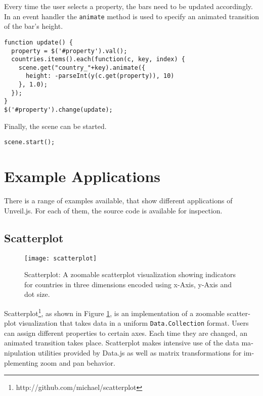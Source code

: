 \begin{english}
\SuperPar Every time the user selects a property, the bars need to be updated accordingly. In an event handler the \texttt{animate} method is used to specify an animated transition of the bar's height.

\begin{verbatim}
function update() {
  property = $('#property').val();
  countries.items().each(function(c, key, index) {
    scene.get("country_"+key).animate({
      height: -parseInt(y(c.get(property)), 10)
    }, 1.0);
  });
}
$('#property').change(update);
\end{verbatim}

\SuperPar Finally, the scene can be started.

\begin{verbatim}
scene.start();
\end{verbatim}


\section{Example Applications}


There is a range of examples available, that show different applications of Unveil.js. For each of them, the source code is available for inspection.

\subsection{Scatterplot}

\begin{figure}
\centering
\texttt{[image: scatterplot]}
\caption{Scatterplot: A zoomable scatterplot visualization showing indicators for countries in three dimensions encoded using x-Axis, y-Axis and dot size.}
\label{fig:scatterplot}
\end{figure}

Scatterplot\footnote{http://github.com/michael/scatterplot}, as shown in Figure \ref{fig:scatterplot}, is an implementation of a zoomable scatterplot visualization that takes data in a uniform \texttt{Data.Collection} format. Users can assign different properties to certain axes. Each time they are changed, an animated transition takes place. Scatterplot makes intensive use of the data manipulation utilities provided by Data.js as well as matrix transformations for implementing zoom and pan behavior.



\end{english}
